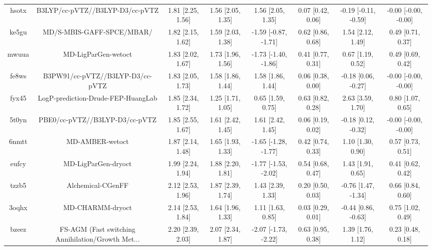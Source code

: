 \documentclass{article}
\begin{document}
\begin{center}
\begin{longtable}{|cccccccc|}
 hsotx &                    B3LYP/cc-pVTZ//B3LYP-D3/cc-pVTZ &  1.81 [2.25, 1.56] &  1.56 [2.05, 1.35] &     1.56 [2.05, 1.35] &  0.07 [0.42, 0.06] &  -0.19 [-0.11, -0.59] &  -0.00 [-0.00, -0.00] \\
 ke5gu &                          MD/S-MBIS-GAFF-SPCE/MBAR/ &  1.82 [2.15, 1.62] &  1.59 [2.03, 1.38] &  -1.59 [-0.87, -1.71] &  0.62 [0.86, 0.68] &     1.54 [2.12, 1.49] &     0.49 [0.71, 0.37] \\
 mwuua &                                MD-LigParGen-wetoct &  1.83 [2.02, 1.67] &  1.73 [1.96, 1.56] &  -1.73 [-1.40, -1.86] &  0.41 [0.77, 0.31] &     0.67 [1.19, 0.52] &     0.49 [0.69, 0.42] \\
 fe8ws &                   B3PW91/cc-pVTZ//B3LYP-D3/cc-pVTZ &  1.83 [2.05, 1.73] &  1.58 [1.86, 1.44] &     1.58 [1.86, 1.44] &  0.06 [0.38, 0.00] &   -0.18 [0.06, -0.27] &  -0.00 [-0.00, -0.00] \\
 fyx45 &                 LogP-prediction-Drude-FEP-HuangLab &  1.85 [2.34, 1.72] &  1.25 [1.71, 1.05] &     0.65 [1.59, 0.75] &  0.63 [0.82, 0.28] &     2.63 [3.59, 1.70] &     0.80 [1.07, 0.65] \\
 5t0yn &                     PBE0/cc-pVTZ//B3LYP-D3/cc-pVTZ &  1.85 [2.55, 1.67] &  1.61 [2.42, 1.45] &     1.61 [2.42, 1.45] &  0.06 [0.19, 0.02] &   -0.18 [0.12, -0.32] &  -0.00 [-0.00, -0.00] \\
 6nmtt &                                    MD-AMBER-wetoct &  1.87 [2.14, 1.48] &  1.65 [1.93, 1.33] &  -1.65 [-1.28, -1.77] &  0.42 [0.74, 0.33] &     1.10 [1.30, 0.90] &     0.57 [0.73, 0.51] \\
 eufcy &                                MD-LigParGen-dryoct &  1.99 [2.24, 1.94] &  1.88 [2.20, 1.81] &  -1.77 [-1.53, -2.02] &  0.54 [0.68, 0.47] &     1.43 [1.91, 0.65] &     0.41 [0.62, 0.42] \\
 tzzb5 &                                  Alchemical-CGenFF &  2.12 [2.53, 1.96] &  1.87 [2.39, 1.74] &     1.43 [2.39, 1.33] &  0.20 [0.50, 0.03] &   -0.76 [1.47, -1.34] &     0.66 [0.84, 0.60] \\
 3oqhx &                                   MD-CHARMM-dryoct &  2.14 [2.53, 1.84] &  1.64 [1.96, 1.33] &     1.11 [1.63, 0.85] &  0.03 [0.29, 0.01] &   -0.44 [0.86, -0.63] &     0.75 [1.02, 0.49] \\
 bzeez &  FS-AGM (Fast switching Annihilation/Growth Met... &  2.20 [2.39, 2.03] &  2.07 [2.34, 1.87] &  -2.07 [-1.73, -2.22] &  0.63 [0.95, 0.38] &     1.39 [1.76, 1.12] &     0.23 [0.48, 0.18] \\

\end{longtable}
\end{center}
\end{document}
